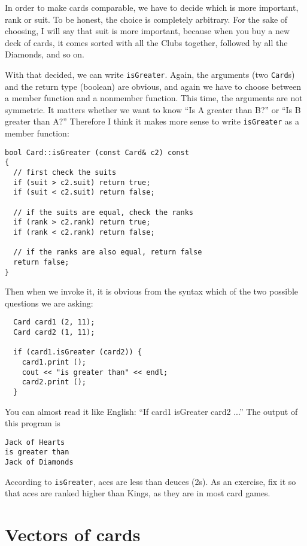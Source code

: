 
In order to make cards comparable, we have to decide which is more
important, rank or suit.  To be honest, the choice is completely
arbitrary.  For the sake of choosing, I will say that suit is more
important, because when you buy a new deck of cards, it comes sorted
with all the Clubs together, followed by all the Diamonds, and so on.

With that decided, we can write {\tt isGreater}.  Again, the arguments
(two {\tt Card}s) and the return type (boolean) are obvious, and again
we have to choose between a member function and a nonmember function.
This time, the arguments are not symmetric.  It matters whether we
want to know ``Is A greater than B?'' or ``Is B greater than A?''
Therefore I think it makes more sense to write {\tt isGreater} as a
member function:

\begin{verbatim}
bool Card::isGreater (const Card& c2) const
{
  // first check the suits
  if (suit > c2.suit) return true;
  if (suit < c2.suit) return false;

  // if the suits are equal, check the ranks
  if (rank > c2.rank) return true;
  if (rank < c2.rank) return false;

  // if the ranks are also equal, return false
  return false;
}
\end{verbatim}
%
Then when we invoke it, it is obvious from the syntax which
of the two possible questions we are asking:

\begin{verbatim}
  Card card1 (2, 11);
  Card card2 (1, 11);

  if (card1.isGreater (card2)) {
    card1.print ();
    cout << "is greater than" << endl;
    card2.print ();
  }
\end{verbatim}
%
You can almost read it like English: ``If card1 isGreater card2 ...''
The output of this program is

\begin{verbatim}
Jack of Hearts
is greater than
Jack of Diamonds
\end{verbatim}
%
According to {\tt isGreater}, aces are
less than deuces (2s).
As an exercise, fix it so that aces are ranked higher than Kings,
as they are in most card games.

\section{Vectors of cards}

